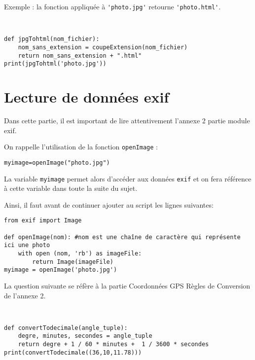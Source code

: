 
Exemple : la fonction appliquée à \verb?'photo.jpg'? retourne \verb?'photo.html'?.

\begin{solution}~\ \\
\begin{verbatim}
def jpgTohtml(nom_fichier):
    nom_sans_extension = coupeExtension(nom_fichier)
    return nom_sans_extension + ".html"
print(jpgTohtml('photo.jpg'))
\end{verbatim}
\end{solution}

\section{Lecture de données exif}

Dans cette partie, il est important de lire attentivement l’annexe 2 partie module exif.

On rappelle l’utilisation de la fonction \verb?openImage? :
\begin{verbatim}
myimage=openImage("photo.jpg")
\end{verbatim}

La variable \verb?myimage? permet alors d’accéder aux données \verb?exif? et on fera référence à cette variable dans toute la suite du sujet.

Ainsi, il faut avant de continuer ajouter au script les lignes suivantes:
\begin{verbatim}
from exif import Image

def openImage(nom): #nom est une chaîne de caractère qui représente ici une photo
    with open (nom, 'rb') as imageFile:
        return Image(imageFile)
myimage = openImage('photo.jpg')
\end{verbatim}

La question suivante se réfère à la partie Coordonnées GPS­ Règles de Conversion de l’annexe 2.


\begin{solution}~\ \\
\begin{verbatim}
def convertTodecimale(angle_tuple):
    degre, minutes, secondes = angle_tuple
    return degre + 1 / 60 * minutes +  1 / 3600 * secondes 
print(convertTodecimale((36,10,11.78)))
\end{verbatim}
\end{solution}

